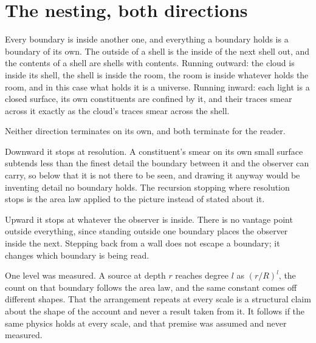 \section{The nesting, both directions}

Every boundary is inside another one, and everything a boundary holds is a boundary of its own. The
outside of a shell is the inside of the next shell out, and the contents of a shell are shells with
contents. Running outward: the cloud is inside its shell, the shell is inside the room, the room is
inside whatever holds the room, and in this case what holds it is a universe. Running inward: each
light is a closed surface, its own constituents are confined by it, and their traces smear across it
exactly as the cloud's traces smear across the shell.

Neither direction terminates on its own, and both terminate for the reader.

Downward it stops at resolution. A constituent's smear on its own small surface subtends less than
the finest detail the boundary between it and the observer can carry, so below that it is not there
to be seen, and drawing it anyway would be inventing detail no boundary holds. The recursion
stopping where resolution stops is the area law applied to the picture instead of stated about it.

Upward it stops at whatever the observer is inside. There is no vantage point outside everything,
since standing outside one boundary places the observer inside the next. Stepping back from a wall
does not escape a boundary; it changes which boundary is being read.

One level was measured. A source at depth $r$ reaches degree $l$ as $(r/R)^l$, the count on that
boundary follows the area law, and the same constant comes off different shapes. That the
arrangement repeats at every scale is a structural claim about the shape of the account and never a
result taken from it. It follows if the same physics holds at every scale, and that premise was
assumed and never measured.
